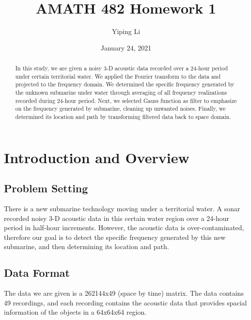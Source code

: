 \documentclass{article}
\title{AMATH 482 Homework 1}
\author{Yiping Li}
\date{January 24, 2021}
\begin{document}
\maketitle

\begin{abstract}
    In this study, we are given a noisy 3-D acoustic data recorded over a 24-hour period under certain territorial water. We applied the Fourier transform to the data and projected to the frequency domain. We determined the specific frequency generated by the unknown submarine under water through averaging of all frequency realizations recorded during 24-hour period. Next, we selected Gauss function as filter to emphasize on the frequency generated by submarine, cleaning up unwanted noises. Finally, we determined its location and path by transforming filtered data back to space domain.
\end{abstract}

\section{Introduction and Overview}
\subsection{Problem Setting}
There is a new submarine technology moving under a territorial water. A sonar recorded noisy 3-D acoustic data in this certain water region over a 24-hour period in half-hour increments. However, the acoustic data is over-contaminated, therefore our goal is to detect the specific frequency generated by this new submarine, and then determining its location and path.

\subsection{Data Format}
The data we are given is a 262144x49 (space by time) matrix. The data contains 49 recordings, and each recording contains the acoustic data that provides spacial information of the objects in a 64x64x64 region.


\end{document}

